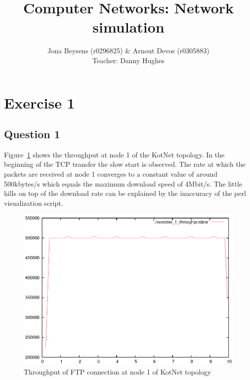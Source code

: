 \documentclass[a4paper]{report}
\title{Computer Networks: Network simulation}
\author{Jona Beysens (r0296825) \& Arnout Devos (r0305883) \\Teacher: Danny Hughes}
\begin{document}
\maketitle
\chapter*{Exercise 1}

\section*{Question 1}
Figure~\ref{ex1:question1} shows the throughput at node 1 of the KotNet topology. 
In the beginning of the TCP transfer the slow start is observed. The rate at which the packets are received at node 1 converges to a constant value of around 500kbytes/s which equals the maximum download speed of 4Mbit/s. The little hills on top of the download rate can be explained by the inaccuracy of the perl visualization script.
\begin{figure}[h]
\centerline{\includegraphics{pictures/E1Q1.eps}}
\caption{Throughput of FTP connection at node 1 of KotNet topology}
\label{ex1:question1}
\end{figure}
\newpage
\end{document}
